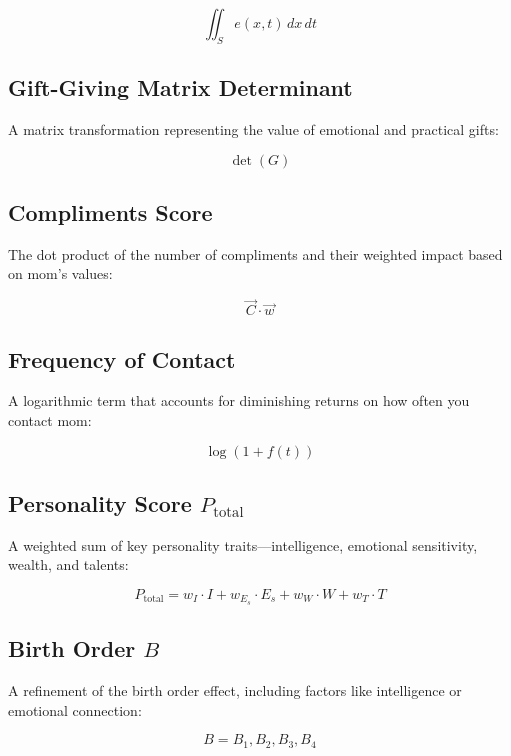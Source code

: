 \documentclass[12pt]{article}
\begin{document}
\begin{equation}
\iint_S e(x, t) \, dx \, dt
\end{equation}

\subsection{Gift-Giving Matrix Determinant}
A matrix transformation representing the value of emotional and practical gifts:

\begin{equation}
\det(G)
\end{equation}

\subsection{Compliments Score}
The dot product of the number of compliments and their weighted impact based on mom’s values:

\begin{equation}
\vec{C} \cdot \vec{w}
\end{equation}

\subsection{Frequency of Contact}
A logarithmic term that accounts for diminishing returns on how often you contact mom:

\begin{equation}
\log(1 + f(t))
\end{equation}

\subsection{Personality Score \( P_{\text{total}} \)}
A weighted sum of key personality traits—intelligence, emotional sensitivity, wealth, and talents:

\begin{equation}
P_{\text{total}} = w_I \cdot I + w_{E_s} \cdot E_s + w_W \cdot W + w_T \cdot T
\end{equation}

\subsection{Birth Order \( B \)}
A refinement of the birth order effect, including factors like intelligence or emotional connection:

\begin{equation}
B = B_1, B_2, B_3, B_4
\end{equation}
\end{document}

